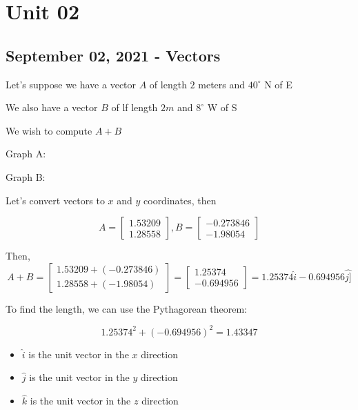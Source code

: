 \documentclass{scrreprt} %
\begin{document}
\section{Unit 02}

\subsection{September 02, 2021 - Vectors}

\begin{remark}
Let's suppose we have a vector $A$ of length $2$ meters and $40^{\circ}$ N of E

We also have a vector $B$ of lf length $2m$ and $8^\circ$ W of S

We wish to compute $A + B$

Graph A:


Graph B:


Let's convert vectors to $x$ and $y$ coordinates, then

$$A = \begin{bmatrix}1.53209\\1.28558\end{bmatrix},
  B = \begin{bmatrix}-0.273846\\-1.98054\end{bmatrix}$$

Then, $$A + B = \begin{bmatrix}1.53209+(-0.273846)\\1.28558+(-1.98054)\end{bmatrix}
              = \begin{bmatrix}1.25374\\-0.694956\end{bmatrix}
              = 1.25374\hat{i} - 0.694956\hat{j]}$$

To find the length, we can use the Pythagorean theorem:

$$1.25374^2 + (-0.694956)^2 = 1.43347$$

\end{remark}

\begin{definition}
  \begin{itemize}
    \item $\hat{i}$ is the unit vector in the $x$ direction
    \item $\hat{j}$ is the unit vector in the $y$ direction
    \item $\hat{k}$ is the unit vector in the $z$ direction
  \end{itemize}
\end{definition}
\end{document}
